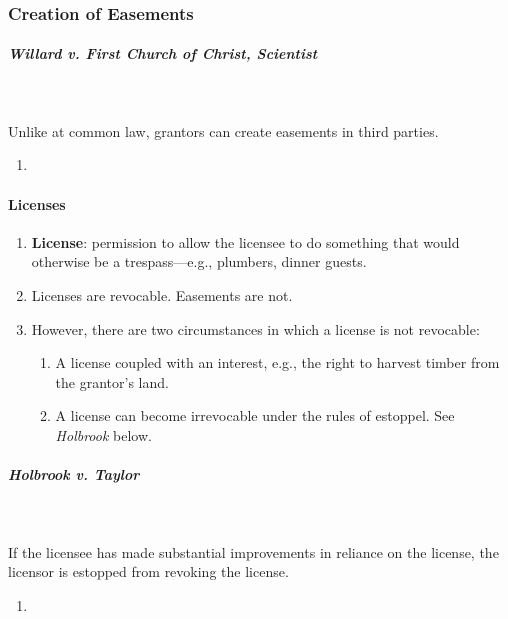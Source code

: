 \subsubsection{Creation of Easements}

\paragraph{\emph{Willard v. First Church of Christ, Scientist}}
~\\\\
Unlike at common law, grantors can create easements in third parties.

\begin{enumerate}
    \item %
\end{enumerate}

\paragraph{Licenses}

\begin{enumerate}
    \item \textbf{License}: permission to allow the licensee to do something 
    that would otherwise be a trespass---e.g., plumbers, dinner guests.
    \item Licenses are revocable. Easements are not.
    \item However, there are two circumstances in which a license is not 
    revocable:
    \begin{enumerate}
        \item A license coupled with an interest, e.g., the right to harvest 
        timber from the grantor's land.
        \item A license can become irrevocable under the rules of estoppel. 
        See \emph{Holbrook} below.
    \end{enumerate}
\end{enumerate}

\paragraph{\emph{Holbrook v. Taylor}}
~\\\\
If the licensee has made substantial improvements in reliance on the license, 
the licensor is estopped from revoking the license.

\begin{enumerate}
    \item %
\end{enumerate}

